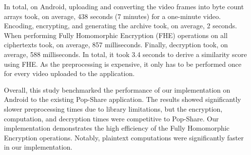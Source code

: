 In total, on Android, uploading and converting the video frames into byte count arrays took, on average, 438 seconds (7 minutes) for a one-minute video. Encoding, encrypting, and generating the archive took, on average, 2 seconds. When performing Fully Homomorphic Encryption (FHE) operations on all ciphertexts took, on average, 857 milliseconds. Finally, decryption took, on average, 588 milliseconds. In total, it took 3.4 seconds to derive a similarity score using FHE. As the preprocessing is expensive, it only has to be performed once for every video uploaded to the application.

Overall, this study benchmarked the performance of our implementation on Android to the existing Pop-Share application. The results showed significantly slower preprocessing times due to library limitations, but the encryption, computation, and decryption times were competitive to Pop-Share. Our implementation demonstrates the high efficiency of the Fully Homomorphic Encryption operations. Notably, plaintext computations were significantly faster in our implementation.
